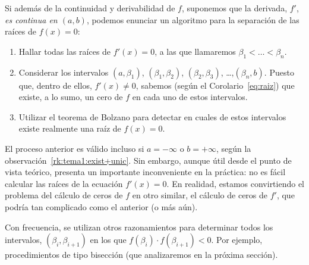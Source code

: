 \begin{remark}
  \label{rk:tema1:separac-ceros}
  Si además de la continuidad y derivabilidad de $f$, suponemos que la
  derivada, $f'$, \emph{es continua en $(a,b)$}, podemos
  enunciar un algoritmo para la separación de las raíces de $f(x)=0$:
  \begin{enumerate}
  \item Hallar todas las raíces de $f'(x)=0$, a las que llamaremos $\beta_1<\dots<\beta_n$.
  \item Considerar los intervalos $(a,\beta_1)$, $(\beta_1,\beta_2)$,
    $(\beta_2,\beta_3)$, \dots,$(\beta_n,b)$. Puesto que, dentro de
    ellos, $f'(x)\neq 0$, sabemos (según el Corolario~\eqref{eq:raiz})
    que existe, a lo sumo, un cero de $f$ en cada uno de estos
    intervalos.
  \item Utilizar el teorema de Bolzano para detectar en cuales de
    estos intervalos existe realmente una raíz de $f(x)=0$.
  \end{enumerate}
  El proceso anterior es válido incluso si $a=-\infty$ o $b=+\infty$,
  según la observación~\ref{rk:tema1:exist+unic}.  Sin embargo, aunque
  útil desde el punto de vista teórico, presenta un importante
  inconveniente en la práctica: no es fácil calcular las raíces de la
  ecuación $f'(x)=0$.  En realidad, estamos convirtiendo el problema
  del cálculo de ceros de $f$ en otro similar, el cálculo de ceros de
  $f'$, que podría tan complicado como el anterior (o más aún).
\end{remark}
Con frecuencia, se utilizan otros razonamientos para determinar
todos los intervalos, $(\beta_i,\beta_{i+1})$ en los que
$f(\beta_i)\cdot f(\beta_{i+1})<0$. Por ejemplo, procedimientos de
tipo bisección (que analizaremos en la próxima sección).


